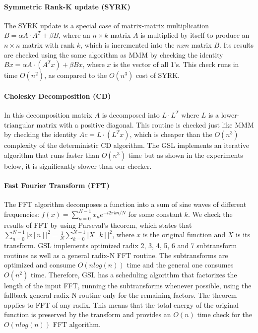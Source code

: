 \documentclass{sig-alternate}
\begin{document}
\paragraph{Symmetric Rank-K update (SYRK)}
The SYRK update is a special case of matrix-matrix multiplication $B = \alpha A \cdot A^T + \beta B$, where an $n \times k$ matrix $A$ is multiplied by itself to produce an $n \times n$ matrix with rank $k$, which is incremented into the $nxn$ matrix $B$.
Its results are checked using the same algorithm as MMM by checking the identity $B x = \alpha A \cdot (A^Tx) + \beta B x$, where $x$ is the vector of all 1's.
This check runs in time $O(n^2)$, as compared to the $O(n^3)$ cost of SYRK.

\paragraph{Cholesky Decomposition (CD)}
In this decomposition matrix $A$ is decomposed into $L \cdot L^T$ where $L$ is a lower-triangular matrix with a positive diagonal.
This routine is checked just like MMM by checking the identity $Ac = L \cdot (L^T x)$, which is cheaper than the $O(n^3)$ complexity of the deterministic CD algorithm.
The GSL implements an iterative algorithm that runs faster than $O(n^3)$ time but as shown in the experiments below, it is significantly slower than our checker.

\paragraph{Fast Fourier Transform (FFT)}
The FFT algorithm decomposes a function into a sum of sine waves of different frequencies: $f(x) = \sum_{n=0}^{N-1} x_n e^{-i2\pi k n / N}$ for some constant $k$.
We check the results of FFT by using Parseval's theorem, which states that $\sum_{n=0}^{N-1} \left| x[n] \right|^2 = \frac{1}{N} \sum_{k=0}^{N-1} \left| X[k] \right|^2$, where $x$ is the original function and $X$ is its transform. GSL implements optimized radix 2, 3, 4, 5, 6 and 7 subtransform routines as well as a general radix-N FFT routine. The subtransforms are optimized and consume $O(n log(n))$ time and the general one consumes $O(n^2)$ time. Therefore, GSL has a scheduling algorithm that factorizes the length of the input FFT, running the subtransforms whenever possible, using the fallback general radix-N routine only for the remaining factors.
The theorem applies to FFT of any radix.
This means that the total energy of the original function is preserved by the transform and provides an $O(n)$ time check for the $O(n log(n))$ FFT algorithm.
\end{document}
